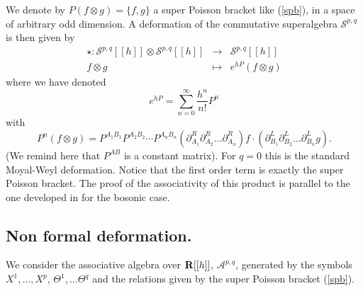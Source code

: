 \documentclass[a4paper,12pt]{article}
\begin{document}
We denote by $P(f\otimes g)=\{f,g\}$ a  super Poisson bracket like
(\ref{spb}),
in a space of arbitrary odd dimension. A deformation of the commutative
superalgebra $\mathcal{S}^{p,q}$ is then given by
\begin{eqnarray}
\star:\mathcal{S}^{p,q}[[h]]\otimes \mathcal{S}^{p,q}[[h]]&\longrightarrow
&\mathcal{S}^{p,q}[[h]]\nonumber\\
f\otimes g&\mapsto & e^{hP}(f\otimes g)\label{ssp}
\end{eqnarray}
where we have denoted 
$$
e^{hP}=\sum_{n=0}^\infty \frac{h^n}{n!}P^n
$$
with
$$
P^n(f\otimes g)=P^{A_1B_1}P^{A_2B_2}\cdots
P^{A_nB_n}(\partial^R_{A_1}\partial^R_{A_2}\dots
\partial^R_{A_n})f\cdot(\partial^L_{B_1}\partial^L_{B_2}
\dots\partial^L_{B_n}g).
$$
(We remind here that $P^{AB}$ is a constant matrix).
For $q=0$ this is the standard Moyal-Weyl deformation. Notice
that the first order term is exactly the super Poisson bracket.
The proof of the associativity of this product is parallel to the one
developed in \cite{bffls} for the bosonic case.

\subsection{Non formal deformation.}

We consider the associative algebra over ${\bf R}[[h]]$, $\mathcal{A}^{p,q}$, 
 generated by the symbols $X^1,\dots , X^p$,
 $\Theta^1,\dots\Theta^q$ and the relations given by the super Poisson
bracket (\ref{spb}). 
\end{document}
